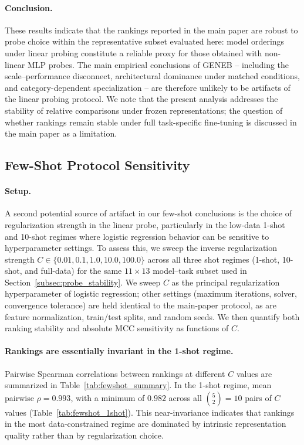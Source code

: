 \documentclass{article}
\theoremstyle{plain}
\theoremstyle{definition}
\theoremstyle{remark}
\begin{document}
\paragraph{Conclusion.}
These results indicate that the rankings reported in the main paper are
robust to probe choice within the representative subset evaluated here:
model orderings under linear probing constitute a reliable proxy for
those obtained with non-linear MLP probes. The main empirical
conclusions of GENEB -- including the scale--performance disconnect,
architectural dominance under matched conditions, and category-dependent
specialization -- are therefore unlikely to be artifacts of the linear
probing protocol. We note that the present analysis addresses the
stability of relative comparisons under frozen representations; the
question of whether rankings remain stable under full task-specific
fine-tuning is discussed in the main paper as a limitation.

\subsection{Few-Shot Protocol Sensitivity}
\label{subsec:fewshot_sensitivity}

\paragraph{Setup.}
A second potential source of artifact in our few-shot conclusions is the
choice of regularization strength in the linear probe, particularly in
the low-data 1-shot and 10-shot regimes where logistic regression
behavior can be sensitive to hyperparameter settings. To assess this, we
sweep the inverse regularization strength
$C \in \{0.01, 0.1, 1.0, 10.0, 100.0\}$
across all three shot regimes (1-shot, 10-shot, and full-data) for the
same $11 \times 13$ model--task subset used in
Section~\ref{subsec:probe_stability}. We sweep $C$ as the principal
regularization hyperparameter of logistic regression; other settings
(maximum iterations, solver, convergence tolerance) are held identical
to the main-paper protocol, as are feature normalization, train/test
splits, and random seeds. We then quantify both ranking stability and
absolute MCC sensitivity as functions of $C$.

\paragraph{Rankings are essentially invariant in the 1-shot regime.}
Pairwise Spearman correlations between rankings at different $C$ values
are summarized in Table~\ref{tab:fewshot_summary}. In the 1-shot regime,
mean pairwise $\rho = 0.993$, with a minimum of $0.982$ across all
$\binom{5}{2}=10$ pairs of $C$ values
(Table~\ref{tab:fewshot_1shot}). This near-invariance indicates that
rankings in the most data-constrained regime are dominated by intrinsic
representation quality rather than by regularization choice.
\end{document}

